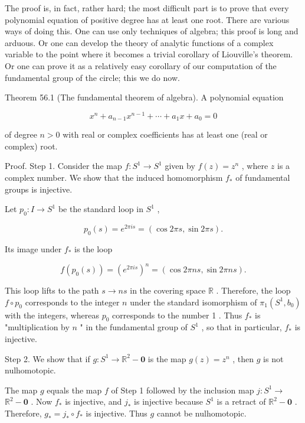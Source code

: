 The proof is, in fact, rather hard; the most difficult part is to prove that every polynomial equation of positive degree has at least one root. There are various ways of doing this. One can use only techniques of algebra; this proof is long and arduous. Or one can develop the theory of analytic functions of a complex variable to the point where it becomes a trivial corollary of Liouville's theorem. Or one can prove it as a relatively easy corollary of our computation of the fundamental group of the circle; this we do now.

Theorem 56.1 (The fundamental theorem of algebra). A polynomial equation

\[
{x}^{n} + {a}_{n - 1}{x}^{n - 1} + \cdots  + {a}_{1}x + {a}_{0} = 0
\]

of degree \(n > 0\) with real or complex coefficients has at least one (real or complex) root.

Proof. Step 1. Consider the map \(f : {S}^{1} \rightarrow  {S}^{1}\) given by \(f\left( z\right)  = {z}^{n}\) , where \(z\) is a complex number. We show that the induced homomorphism \({f}_{ * }\) of fundamental groups is injective.

Let \({p}_{0} : I \rightarrow  {S}^{1}\) be the standard loop in \({S}^{1}\) ,

\[
{p}_{0}\left( s\right)  = {e}^{2\pi is} = \left( {\cos {2\pi s},\sin {2\pi s}}\right) .
\]

Its image under \({f}_{ * }\) is the loop

\[
f\left( {{p}_{0}\left( s\right) }\right)  = {\left( {e}^{2\pi is}\right) }^{n} = \left( {\cos {2\pi ns},\sin {2\pi ns}}\right) .
\]

This loop lifts to the path \(s \rightarrow  {ns}\) in the covering space \(\mathbb{R}\) . Therefore, the loop \(f \circ  {p}_{0}\) corresponds to the integer \(n\) under the standard isomorphism of \({\pi }_{1}\left( {{S}^{1},{b}_{0}}\right)\) with the integers, whereas \({p}_{0}\) corresponds to the number 1 . Thus \({f}_{ * }\) is "multiplication by \(n\) " in the fundamental group of \({S}^{1}\) , so that in particular, \({f}_{ * }\) is injective.

Step 2. We show that if \(g : {S}^{1} \rightarrow  {\mathbb{R}}^{2} - \mathbf{0}\) is the map \(g\left( z\right)  = {z}^{n}\) , then \(g\) is not nulhomotopic.

The map \(g\) equals the map \(f\) of Step 1 followed by the inclusion map \(j : {S}^{1} \rightarrow\)  \({\mathbb{R}}^{2} - \mathbf{0}\) . Now \({f}_{ * }\) is injective, and \({j}_{ * }\) is injective because \({S}^{1}\) is a retract of \({\mathbb{R}}^{2} - \mathbf{0}\) . Therefore, \({g}_{ * } = {j}_{ * } \circ  {f}_{ * }\) is injective. Thus \(g\) cannot be nulhomotopic.

